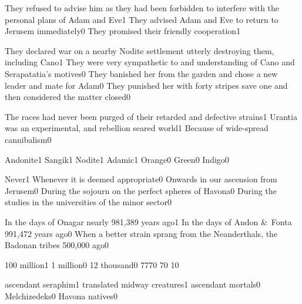 {They refused to advise him as they had been forbidden to interfere with the personal plans of Adam and Eve}{1}
{They advised Adam and Eve to return to Jerusem immediately}{0}
{They promised their friendly cooperation}{1}
\qstop

{They declared war on a nearby Nodite settlement utterly destroying them, including Cano}{1}
{They were very sympathetic to and understanding of Cano and Serapatatia's motives}{0}
{They banished her from the garden and chose a new leader and mate for Adam}{0}
{They punished her with forty stripes save one and then considered the matter closed}{0}
\qstop

{The races had never been purged of their retarded and defective strains}{1}
{Urantia was an experimental, and rebellion seared world}{1}
{Because of wide-spread cannibalism}{0}
\qstop

{Andonite}{1}
{Sangik}{1}
{Nodite}{1}
{Adamic}{1}
{Orange}{0}
{Green}{0}
{Indigo}{0}
\qstop

{Never}{1}
{Whenever it is deemed appropriate}{0}
{Onwards in our ascension from Jerusem}{0}
{During the sojourn on the perfect spheres of Havona}{0}
{During the studies in the universities of the minor sector}{0}
\qstop

{In the days of Onagar nearly 981,389 years ago}{1}
{In the days of Andon \&\ Fonta 991,472 years ago}{0}
{When a better strain sprang from the Neanderthals, the Badonan tribes 500,000 ago}{0}
\qstop

{100 million}{1}
{1 million}{0}
{12 thousand}{0}
{777}{0}
{7}{0}
{1}{0}
\qstop

{ascendant seraphim}{1}
{translated midway creatures}{1}
{ascendant mortals}{0}
{Melchizedeks}{0}
{Havona natives}{0}
\qstop

